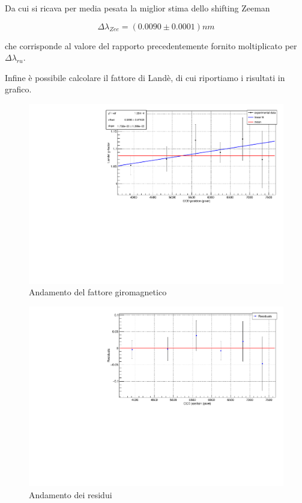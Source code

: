 \documentclass{article}
\begin{document}
	Da cui si ricava per media pesata la miglior stima dello shifting Zeeman

	\[
		\Delta\lambda_{Zee} = (0.0090 \pm 0.0001) nm	
	\]

	che corrisponde al valore del rapporto precedentemente fornito moltiplicato per $\Delta\lambda_{ru}$.

	Infine è possibile calcolare il fattore di Landè, di cui riportiamo i risultati in grafico.

	\begin{center}
		\begin{figure}[H]
			\centering
			\includegraphics[scale=0.38, angle=0]{campomin/g.pdf}
			\caption{Andamento del fattore giromagnetico}
			\label{fig:g_min}
		\end{figure}
	\end{center}

	\begin{center}
		\begin{figure}[H]
			\centering
			\includegraphics[scale=0.38, angle=0]{campomin/g_residuals.pdf}
			\caption{Andamento dei residui}
			\label{fig:g_res_min}
		\end{figure}
	\end{center}
\end{document}
